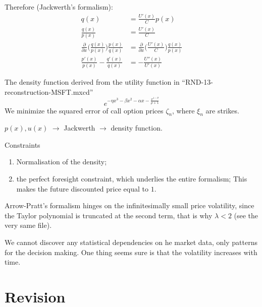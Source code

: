\documentclass[a4paper]{article}
\begin{document}
Therefore (Jackwerth's formalism):
\begin{align*}
	q(x) &= \frac{U'(x)}{C}p(x)\\
	\frac{q(x)}{p(x)} &= \frac{U'(x)}{C}\\
	\frac{\partial}{\partial x}\Big(\frac{q(x)}{p(x)}\Big)\frac{p(x)}{q(x)} &= \frac{\partial}{\partial x}\Big(\frac{U'(x)}{C}\Big) \frac{q(x)}{p(x)}\\
	\frac{p'(x)}{p(x)} - \frac{q'(x)}{q(x)} &= - \frac{U''(x)}{U'(x)}
\end{align*}

The density function derived from the utility function in ``RND-13-reconstruction-MSFT.mxcd''
\[e^{-\eta x^3 - \beta x^2 - \alpha x - \frac{x^{1-\theta}}{\rho+1} }\]
We minimize the squared error of call option prices $\zeta_n$, where $\xi_n$ are strikes.

$p(x), u(x)$ $\to$ Jackwerth $\to$ density function.

Constraints \begin{enumerate}
	\item Normalisation of the density;
	\item the perfect foresight constraint, which underlies the entire formalism; This makes the future discounted price equal to $1$.
\end{enumerate}

Arrow-Pratt's formalism hinges on the infinitesimally small price volatility, since the Taylor polynomial is truncated at the second term, that is why $\lambda<2$ (see the very same file).


We cannot discover any statistical dependencies on he market data, only patterns for the decision making. One thing seems sure is that the volatility increases with time.





\section{Revision} %
\label{sec:revision}
\end{document}
